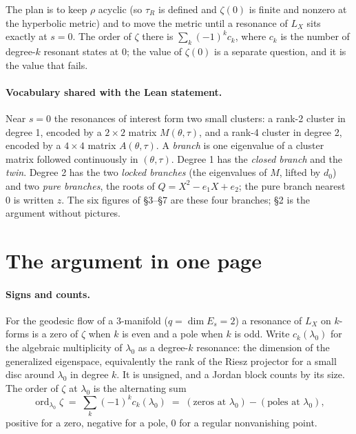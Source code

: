 \documentclass[11pt]{article}
\begin{document}
\noindent The plan is to keep $\rho$ acyclic (so $\tau_R$ is defined and $\zeta(0)$ is finite
and nonzero at the hyperbolic metric) and to move the metric until a resonance of $L_X$ sits
exactly at $s = 0$. The order of $\zeta$ there is $\sum_k (-1)^k c_k$, where $c_k$ is the number
of degree-$k$ resonant states at $0$; the value of $\zeta(0)$ is a separate question, and it is
the value that fails.

\paragraph{Vocabulary shared with the Lean statement.} Near $s = 0$ the resonances of interest
form two small clusters: a rank-2 cluster in degree 1, encoded by a $2\times 2$ matrix
$M(\theta,\tau)$, and a rank-4 cluster in degree 2, encoded by a $4\times 4$ matrix
$A(\theta,\tau)$. A \emph{branch} is one eigenvalue of a cluster matrix followed continuously in
$(\theta,\tau)$. Degree 1 has the \emph{closed branch} and the \emph{twin}. Degree 2 has the two
\emph{locked branches} (the eigenvalues of $M$, lifted by $d_0$) and two \emph{pure branches}, the
roots of $Q = X^2 - e_1 X + e_2$; the pure branch nearest $0$ is written $z$. The six figures
of \S3--\S7 are these four branches; \S2 is the argument without pictures.

\section{The argument in one page}

\paragraph{Signs and counts.} For the geodesic flow of a 3-manifold ($q = \dim E_s = 2$) a
resonance of $L_X$ on $k$-forms is a zero of $\zeta$ when $k$ is even and a pole when $k$ is odd.
Write $c_k(\lambda_0)$ for the algebraic multiplicity of $\lambda_0$ as a degree-$k$ resonance:
the dimension of the generalized eigenspace, equivalently the rank of the Riesz projector for a
small disc around $\lambda_0$ in degree $k$. It is unsigned, and a Jordan block counts by its
size. The order of $\zeta$ at $\lambda_0$ is the alternating sum
\[
\operatorname{ord}_{\lambda_0}\zeta \;=\; \sum_k (-1)^k c_k(\lambda_0)
\;=\; (\text{zeros at }\lambda_0) - (\text{poles at }\lambda_0),
\]
positive for a zero, negative for a pole, $0$ for a regular nonvanishing point.
\end{document}
